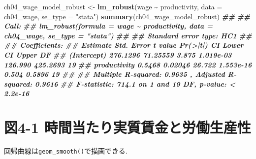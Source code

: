 \documentclass[
]{book}
\newenvironment{Shaded}{\begin{snugshade}}{\end{snugshade}}
\newcommand{\AttributeTok}[1]{\textcolor[rgb]{0.13,0.29,0.53}{#1}}
\newcommand{\DocumentationTok}[1]{\textcolor[rgb]{0.56,0.35,0.01}{\textbf{\textit{#1}}}}
\newcommand{\FunctionTok}[1]{\textcolor[rgb]{0.13,0.29,0.53}{\textbf{#1}}}
\newcommand{\NormalTok}[1]{#1}
\newcommand{\OtherTok}[1]{\textcolor[rgb]{0.56,0.35,0.01}{#1}}
\newcommand{\SpecialCharTok}[1]{\textcolor[rgb]{0.81,0.36,0.00}{\textbf{#1}}}
\newcommand{\StringTok}[1]{\textcolor[rgb]{0.31,0.60,0.02}{#1}}
\begin{document}
\begin{Shaded}
\begin{Highlighting}[]
\NormalTok{ch04\_wage\_model\_robust }\OtherTok{\textless{}{-}} \FunctionTok{lm\_robust}\NormalTok{(wage }\SpecialCharTok{\textasciitilde{}}\NormalTok{ productivity, }\AttributeTok{data =}\NormalTok{ ch04\_wage, }\AttributeTok{se\_type =} \StringTok{"stata"}\NormalTok{)}
\FunctionTok{summary}\NormalTok{(ch04\_wage\_model\_robust)}
\DocumentationTok{\#\# }
\DocumentationTok{\#\# Call:}
\DocumentationTok{\#\# lm\_robust(formula = wage \textasciitilde{} productivity, data = ch04\_wage, se\_type = "stata")}
\DocumentationTok{\#\# }
\DocumentationTok{\#\# Standard error type:  HC1 }
\DocumentationTok{\#\# }
\DocumentationTok{\#\# Coefficients:}
\DocumentationTok{\#\#              Estimate Std. Error t value  Pr(\textgreater{}|t|) CI Lower CI Upper DF}
\DocumentationTok{\#\# (Intercept)  276.1296   71.25559   3.875 1.019e{-}03  126.990 425.2693 19}
\DocumentationTok{\#\# productivity   0.5468    0.02046  26.722 1.553e{-}16    0.504   0.5896 19}
\DocumentationTok{\#\# }
\DocumentationTok{\#\# Multiple R{-}squared:  0.9635 ,    Adjusted R{-}squared:  0.9616 }
\DocumentationTok{\#\# F{-}statistic: 714.1 on 1 and 19 DF,  p{-}value: \textless{} 2.2e{-}16}
\end{Highlighting}
\end{Shaded}

\hypertarget{ux56f34-1-ux6642ux9593ux5f53ux305fux308aux5b9fux8ceaux8cc3ux91d1ux3068ux52b4ux50cdux751fux7523ux6027}{%
\section*{図4-1 時間当たり実質賃金と労働生産性}\label{ux56f34-1-ux6642ux9593ux5f53ux305fux308aux5b9fux8ceaux8cc3ux91d1ux3068ux52b4ux50cdux751fux7523ux6027}}

回帰曲線は\texttt{geom\_smooth()}で描画できる.
\end{document}
